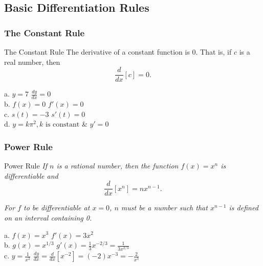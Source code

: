 \documentclass[12pt]{article}
\theoremstyle{beautifulthm}
\begin{document}
\newpage
\subsection{Basic Differentiation Rules}
\subsubsection{The Constant Rule}
\begin{mytheorem}{The Constant Rule}{}
The derivative of a constant function is 0. That is, if \( c \) is a real number, then
\[
\frac{d}{dx}[c] = 0.
\]
\end{mytheorem}


\begin{tcolorbox}[colback=examplebg, colframe=red!75!black, title=\textbf{EXAMPLE 1: Using the Constant Rule}, fonttitle=\bfseries, sharp corners]
a. \( y = 7 \) \rightarrow \( \frac{dy}{dx} = 0 \) \\
b. \( f(x) = 0 \) \rightarrow \( f'(x) = 0 \) \\
c. \( s(t) = -3 \) \rightarrow \( s'(t) = 0 \) \\
d. \( y = k\pi^2, k \text{ is constant} \) & \( y' = 0 \)

\end{tcolorbox}


\subsubsection{Power Rule}
\begin{mytheorem}{Power Rule}{}
\textit{If \( n \) is a rational number, then the function \( f(x) = x^n \) is differentiable and}
\[ \frac{d}{dx}[x^n] = nx^{n-1}. \]

\textit{For \( f \) to be differentiable at \( x = 0 \), \( n \) must be a number such that \( x^{n-1} \) is defined on an interval containing 0.}
\end{mytheorem}

\begin{tcolorbox}[colback=examplebg, colframe=red!75!black, title=\textbf{EXAMPLE 2: Using the Power Rule}, fonttitle=\bfseries, sharp corners]
a. \( f(x) = x^3 \) \rightarrow \( f'(x) = 3x^2 \) \\
b. \( g(x) = x^{1/3} \) \rightarrow \( g'(x) = \frac{1}{3}x^{-2/3} = \frac{1}{3x^{2/3}} \) \\
c. \( y = \frac{1}{x^2} \) \rightarrow \( \frac{dy}{dx} = \frac{d}{dx}[x^{-2}] = (-2)x^{-3} = -\frac{2}{x^3} \) \\

\end{tcolorbox}
\end{document}
